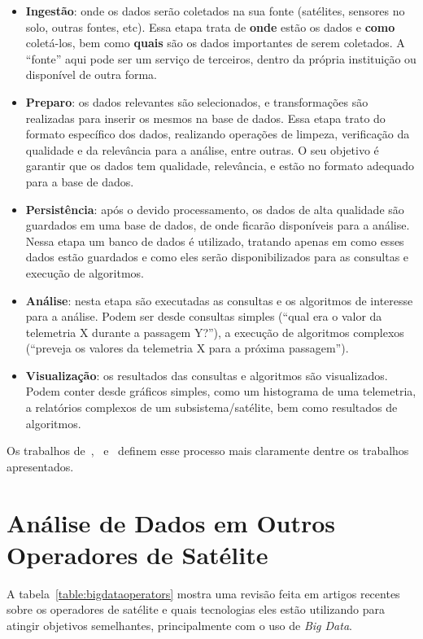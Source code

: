 \begin{itemize}
	\item \textbf{Ingestão}: onde os dados serão coletados na sua fonte (satélites, sensores no solo, outras fontes, etc).
	      Essa etapa trata de \textbf{onde} estão os dados e \textbf{como} coletá-los, bem como \textbf{quais} são os dados importantes de serem coletados.
	      A ``fonte'' aqui pode ser um serviço de terceiros, dentro da própria instituição ou disponível de outra forma.
	\item \textbf{Preparo}: os dados relevantes são selecionados, e transformações são realizadas para inserir os mesmos na base de dados.
	      Essa etapa trato do formato específico dos dados, realizando operações de limpeza, verificação da qualidade e da relevância para a análise, entre outras.
	      O seu objetivo é garantir que os dados tem qualidade, relevância, e estão no formato adequado para a base de dados.
	\item \textbf{Persistência}: após o devido processamento, os dados de alta qualidade são guardados em uma base de dados, de onde ficarão disponíveis para a análise.
	      Nessa etapa um banco de dados é utilizado, tratando apenas em como esses dados estão guardados e como eles serão disponibilizados para as consultas e execução de algoritmos.
	\item \textbf{Análise}: nesta etapa são executadas as consultas e os algoritmos de interesse para a análise.
	      Podem ser desde consultas simples (``qual era o valor da telemetria X durante a passagem Y?''), a execução de algoritmos complexos (``preveja os valores da telemetria X para a próxima passagem'').
	\item \textbf{Visualização}: os resultados das consultas e algoritmos são visualizados.
	      Podem conter desde gráficos simples, como um histograma de uma telemetria, a relatórios complexos de um subsistema/satélite, bem como resultados de algoritmos.
\end{itemize}

Os trabalhos de~\cite{zhangBigDataFramework2017},~\cite{mateikUsingBigData2017} e~\cite{boussoufBigDataBased2018} definem esse processo mais claramente dentre os trabalhos apresentados.

\section{Análise de Dados em Outros Operadores de Satélite}\label{ch:corr:ops}

A tabela~\ref{table:bigdataoperators} mostra uma revisão feita em artigos recentes sobre os operadores de satélite e quais tecnologias eles estão utilizando para atingir objetivos semelhantes, principalmente com o uso de \textit{Big Data}.

